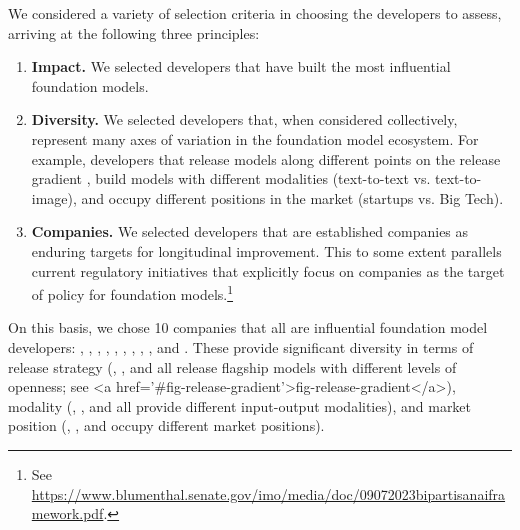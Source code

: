 \documentclass[screen, authorversion, acmsmall]{acmart}
\begin{document}
We considered a variety of selection criteria in choosing the \numcompanies developers to assess, arriving at the following three principles:
\begin{enumerate}
\item \textbf{Impact.} We selected developers that have built the most influential foundation models.
\item \textbf{Diversity.} We selected developers that, when considered collectively, represent many axes of variation in the foundation model ecosystem. For example, developers that release models along different points on the release gradient \cite[\eg open vs. closed,][]{solaiman2023gradient}, build models with different modalities (\eg text-to-text vs. text-to-image), and occupy different positions in the market (\eg startups vs. Big Tech). 
\item \textbf{Companies.} 
We selected developers that are established companies as enduring targets for longitudinal improvement. 
This to some extent parallels current regulatory initiatives that explicitly focus on companies as the target of policy for foundation models.\footnote{See \url{https://www.blumenthal.senate.gov/imo/media/doc/09072023bipartisanaiframework.pdf}.} 
\end{enumerate}
On this basis, we chose 10 companies that all are influential foundation model developers: 
\aitwentyone, \amazon, \anthropic, \cohere, \google, \huggingface, \inflection, \meta, \openai, and \stability.
These \numcompanies provide significant diversity in terms of release strategy (\eg \anthropic, \meta, and \huggingface all release flagship models with different levels of openness; see <a href='#fig-release-gradient'>fig-release-gradient</a>), modality (\eg \cohere, \openai, and \stability all provide different input-output modalities), and market position (\eg \google, \inflection, and \openai occupy different market positions).
\end{document}
